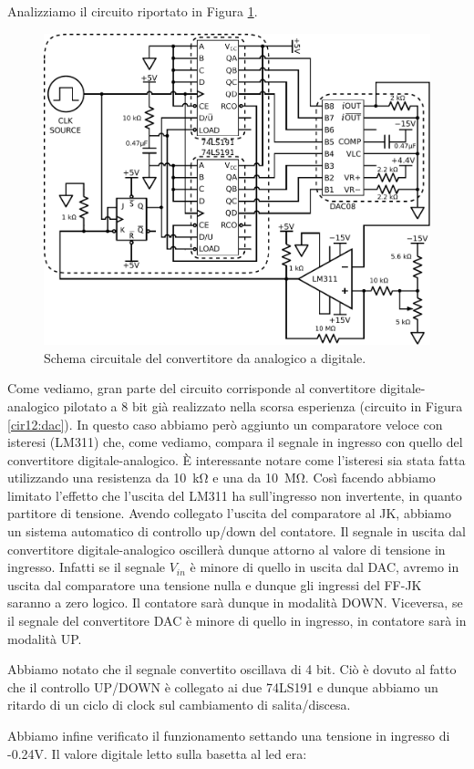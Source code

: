 Analizziamo il circuito riportato in Figura \ref{cir13:ADC}.

\begin{figure}[htpc]
\centering
	\includegraphics[width=.62\textwidth]{../E13/latex/ADC.pdf}
	\caption{Schema circuitale del convertitore da analogico a digitale.}
	\label{cir13:ADC}
\end{figure}

Come vediamo, gran parte del circuito corrisponde al convertitore digitale-analogico pilotato a 8 bit già realizzato nella scorsa esperienza (circuito in Figura \ref{cir12:dac}). In questo caso abbiamo però aggiunto un comparatore veloce con isteresi (LM311) che, come vediamo, compara il segnale in ingresso con quello del convertitore digitale-analogico. È interessante notare come l'isteresi sia stata fatta utilizzando una resistenza da \SI{10}{\kilo\ohm} e una da \SI{10}{\mega\ohm}. Così facendo abbiamo limitato l'effetto che l'uscita del LM311 ha sull'ingresso non invertente, in quanto partitore di tensione. Avendo collegato l'uscita del comparatore al JK, abbiamo un sistema automatico di controllo up/down del contatore. Il segnale in uscita dal convertitore digitale-analogico oscillerà dunque attorno al valore di tensione in ingresso. Infatti se il segnale $V_{in}$ è minore di quello in uscita dal DAC, avremo in uscita dal comparatore una tensione nulla e dunque gli ingressi del FF-JK saranno a zero logico. Il contatore sarà dunque in modalità DOWN. Viceversa, se il segnale del convertitore DAC è minore di quello in ingresso, in contatore sarà in modalità UP. 

Abbiamo notato che il segnale convertito oscillava di 4 bit. Ciò è dovuto al fatto che il controllo UP/DOWN è collegato ai due 74LS191 e dunque abbiamo un ritardo di un ciclo di clock sul cambiamento di salita/discesa.

Abbiamo infine verificato il funzionamento settando una tensione in ingresso di -0.24V. Il valore digitale letto sulla basetta al led era:

